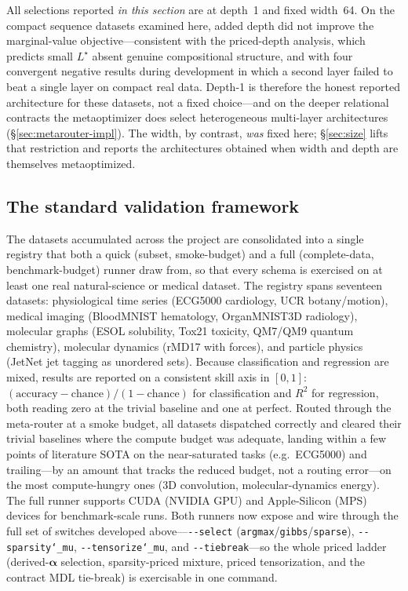 \documentclass[11pt]{article}
\newcommand{\allowbreakhere}{\discretionary{}{}{}}
\newcommand{\code}[1]{\texttt{\def\_{\char`_\allowbreakhere}#1}}
\newcommand{\alphapar}{\bm{\alpha}}
\begin{document}
All selections reported \emph{in this section} are at depth~1 and fixed width~64. On the compact
sequence datasets examined here,
added depth did not improve the marginal-value objective---consistent with the priced-depth
analysis, which predicts small $L^\star$ absent genuine compositional structure, and with four
convergent negative results during development in which a second layer failed to beat a single
layer on compact real data. Depth-1 is therefore the honest reported architecture for these
datasets, not a fixed choice---and on the deeper relational contracts the metaoptimizer does
select heterogeneous multi-layer architectures (\S\ref{sec:metarouter-impl}). The width, by
contrast, \emph{was} fixed here; \S\ref{sec:size} lifts that restriction
and reports the architectures obtained when width and depth are themselves metaoptimized.

\subsection{The standard validation framework}
\label{sec:stdval}

The datasets accumulated across the project are consolidated into a single registry that both a quick
(subset, smoke-budget) and a full (complete-data, benchmark-budget) runner draw from, so that every
schema is exercised on at least one real natural-science or medical dataset. The registry spans
seventeen datasets: physiological time series (ECG5000 cardiology, UCR botany/motion), medical imaging
(BloodMNIST hematology, OrganMNIST3D radiology), molecular graphs (ESOL solubility, Tox21 toxicity,
QM7/QM9 quantum chemistry), molecular dynamics (rMD17 with forces), and particle physics (JetNet jet
tagging as unordered sets). Because classification and regression are mixed, results are reported on a
consistent skill axis in $[0,1]$: $(\text{accuracy}-\text{chance})/(1-\text{chance})$ for
classification and $R^2$ for regression, both reading zero at the trivial baseline and one at perfect.
Routed through the meta-router at a smoke budget, all datasets dispatched correctly and cleared their
trivial baselines where the compute budget was adequate, landing within a few points of literature SOTA
on the near-saturated tasks (e.g.\ ECG5000) and trailing---by an amount that tracks the reduced
budget, not a routing error---on the most compute-hungry ones ($3$D convolution, molecular-dynamics
energy). The full runner supports CUDA (NVIDIA GPU) and Apple-Silicon (MPS)  devices for benchmark-scale runs. Both
runners now expose and wire through the full set of switches developed above---\code{-{}-select}
(\code{argmax}/\code{gibbs}/\code{sparse}), \code{-{}-sparsity\_mu}, \code{-{}-tensorize\_mu}, and
\code{-{}-tiebreak}---so the whole priced ladder (derived-$\alphapar$ selection, sparsity-priced mixture,
priced tensorization, and the contract MDL tie-break) is exercisable in one command.
\end{document}

